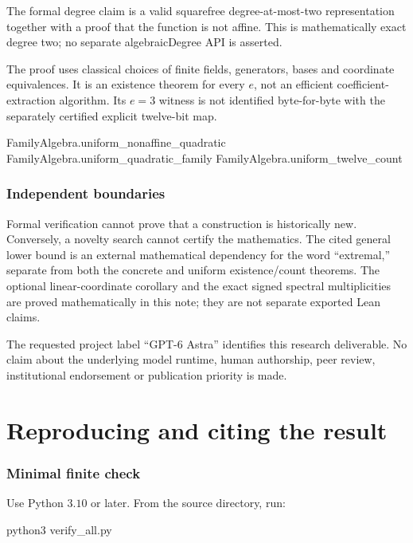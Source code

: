 \documentclass[11pt,a4paper]{article}
\theoremstyle{definition}
\begin{document}
The formal degree claim is a valid squarefree degree-at-most-two representation together with a proof that the function is not affine. This is mathematically exact degree two; no separate algebraicDegree API is asserted.


The proof uses classical choices of finite fields, generators, bases and coordinate equivalences. It is an existence theorem for every $e$, not an efficient coefficient-extraction algorithm. Its $e=3$ witness is not identified byte-for-byte with the separately certified explicit twelve-bit map.


\begin{Code}
FamilyAlgebra.uniform_nonaffine_quadratic
FamilyAlgebra.uniform_quadratic_family
FamilyAlgebra.uniform_twelve_count
\end{Code}

\subsubsection*{Independent boundaries}

Formal verification cannot prove that a construction is historically new. Conversely, a novelty search cannot certify the mathematics. The cited general lower bound is an external mathematical dependency for the word ``extremal,'' separate from both the concrete and uniform existence/count theorems. The optional linear-coordinate corollary and the exact signed spectral multiplicities are proved mathematically in this note; they are not separate exported Lean claims.


The requested project label ``GPT-6 Astra'' identifies this research deliverable. No claim about the underlying model runtime, human authorship, peer review, institutional endorsement or publication priority is made.


\section{Reproducing and citing the result}\label{app:D}

\subsubsection*{Minimal finite check}

Use Python $3.10$ or later. From the source directory, run:


\begin{Code}
python3 verify_all.py
\end{Code}
\end{document}
